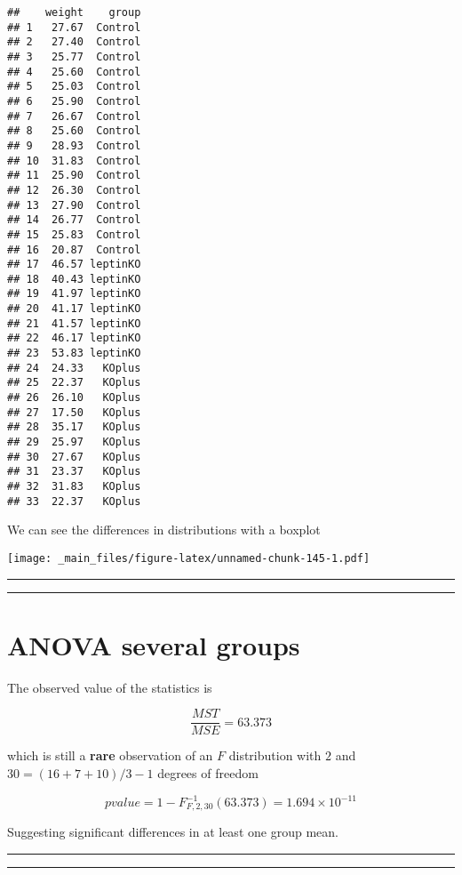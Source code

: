 \documentclass[
]{book}
\begin{document}
\begin{verbatim}
##    weight    group
## 1   27.67  Control
## 2   27.40  Control
## 3   25.77  Control
## 4   25.60  Control
## 5   25.03  Control
## 6   25.90  Control
## 7   26.67  Control
## 8   25.60  Control
## 9   28.93  Control
## 10  31.83  Control
## 11  25.90  Control
## 12  26.30  Control
## 13  27.90  Control
## 14  26.77  Control
## 15  25.83  Control
## 16  20.87  Control
## 17  46.57 leptinKO
## 18  40.43 leptinKO
## 19  41.97 leptinKO
## 20  41.17 leptinKO
## 21  41.57 leptinKO
## 22  46.17 leptinKO
## 23  53.83 leptinKO
## 24  24.33   KOplus
## 25  22.37   KOplus
## 26  26.10   KOplus
## 27  17.50   KOplus
## 28  35.17   KOplus
## 29  25.97   KOplus
## 30  27.67   KOplus
## 31  23.37   KOplus
## 32  31.83   KOplus
## 33  22.37   KOplus
\end{verbatim}

We can see the differences in distributions with a boxplot

\texttt{[image: \_main\_files/figure-latex/unnamed-chunk-145-1.pdf]}

\begin{center}\rule{0.5\linewidth}{0.5pt}\end{center}

\begin{center}\rule{0.5\linewidth}{0.5pt}\end{center}

\hypertarget{anova-several-groups-3}{%
\section{ANOVA several groups}\label{anova-several-groups-3}}

The observed value of the statistics is

\[\frac{MST}{MSE}=63.373\]

which is still a \textbf{rare} observation of an \(F\) distribution with \(2\) and \(30=(16+7+10)/3-1\) degrees of freedom

\[pvalue=1-F^{-1}_{F,2,30}(63.373)=1.694 \times 10^{-11}\]

Suggesting significant differences in at least one group mean.

\begin{center}\rule{0.5\linewidth}{0.5pt}\end{center}

\begin{center}\rule{0.5\linewidth}{0.5pt}\end{center}
\end{document}
